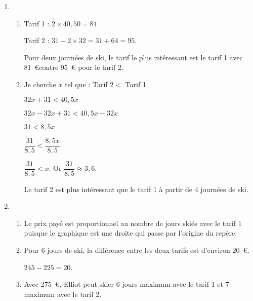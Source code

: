 
\medskip

\begin{enumerate}
\item 
	\begin{enumerate}
		\item Tarif 1 : $2 \times 40,50 = 81$
		
Tarif 2 : $31 + 2 \times 32 = 31 + 64 = 95$.
		
Pour deux journées de ski, le tarif le plus intéressant est le tarif 1 avec 81~\euro contre 95~\euro
pour le tarif 2.
		\item Je cherche $x$ tel que : Tarif $2 <$ Tarif 1

$32x + 31 < 40,5x$

$32x - 32x + 31 < 40,5x - 32x$

$31 < 8,5x$

$\dfrac{31}{8,5} < \dfrac{8,5x}{8,5}$

$\dfrac{31}{8,5} < x$. Or $\dfrac{31}{8,5} \approx 3,6$.

Le tarif 2 est plus intéressant que le tarif 1 à partir de 4 journées de ski.
	\end{enumerate}
\item 
	\begin{enumerate}
		\item Le prix payé est proportionnel au nombre de jours skiés avec le tarif 1 puisque le
graphique est une droite qui passe par l'origine du repère.
		\item Pour 6 jours de ski, la différence entre les deux tarifs est d'environ 20~\euro.
		
$245 - 225 = 20$.
		\item Avec 275~\euro, Elliot peut skier 6 jours maximum avec le tarif 1 et 7 maximum avec le
tarif 2.
	\end{enumerate}
\end{enumerate}


\vspace{0,5cm}

